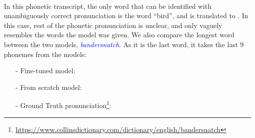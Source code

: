 \textcolor{blue}{}
\\
In this phonetic transcript, the only word that can be identified with unambiguously correct pronunciation is the word ``bird'', and is translated to \textipa{[b " 3 : d]}. In this case, rest of the phonetic pronunciation is unclear, and only vaguely resembles the words the model was given. We also compare the longest word between the two models, \emph{\textcolor{blue}{bandersnatch}}. As it is the last word, it takes the last 9 phonemes from the models:
\begin{enumerate}
    \item[-] Fine-tuned model: \textcolor{blue}{}
    \item[-] From scratch model: \textcolor{blue}{}
    \item[-] Ground Truth pronunciation\footnote{\url{https://www.collinsdictionary.com/dictionary/english/bandersnatch}}:  \textcolor{blue}{} 
\end{enumerate}
% 
% 
% 
% 

